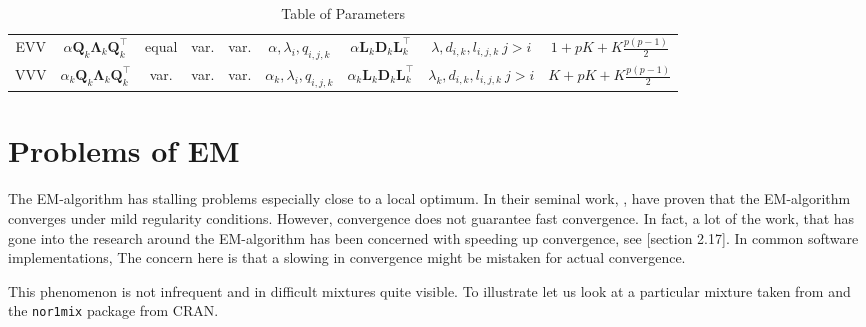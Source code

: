 \begin{table}[!htb]
{\begin{tabular}{| c | c c c c c | c c c |}
        \hline
        EVV    & $ \alpha \pmb{Q}_k \pmb{\Lambda}_k \pmb{Q}_k^\top $ & equal & var. & var. & $ \alpha, \lambda_{i}, q_{i,j,k} $ & $ \alpha \pmb{L}_k \pmb{D}_k \pmb{L}_k^\top $ & $ \lambda, d_{i,k}, l_{i,j,k}\ j>i $ & $ 1+pK+K\frac{p(p-1)}{2} $  \\
        VVV    & $ \alpha_k \pmb{Q}_k \pmb{\Lambda}_k \pmb{Q}_k^\top $ & var. & var. & var. & $ \alpha_k, \lambda_{i}, q_{i,j,k} $ & $ \alpha_k \pmb{L}_k \pmb{D}_k \pmb{L}_k^\top $ & $ \lambda_k, d_{i,k}, l_{i,j,k}\ j>i $ & $ K+pK+K\frac{p(p-1)}{2} $ \\
        \hline
    \end{tabular}

}

\caption{Table of Parameters}
\label{table:param}
\end{table}

\clearpage


\section{Problems of EM}


The EM-algorithm has stalling problems especially close to a local optimum.
In their seminal work, \cite{Dem77}, have proven that the EM-algorithm 
converges under mild regularity conditions. 
However, convergence does not guarantee fast convergence. In fact, a lot of 
the work, that has gone into the research around the EM-algorithm has been 
concerned with speeding up convergence, see \cite{McL00}[section 2.17].
In common software implementations, %
The concern here is that a slowing in convergence might be mistaken for actual
convergence.

This phenomenon is not infrequent and in difficult mixtures quite visible.
To illustrate let us look at a particular mixture taken from \cite{Mar92} and
the {\tt nor1mix} package from CRAN.



